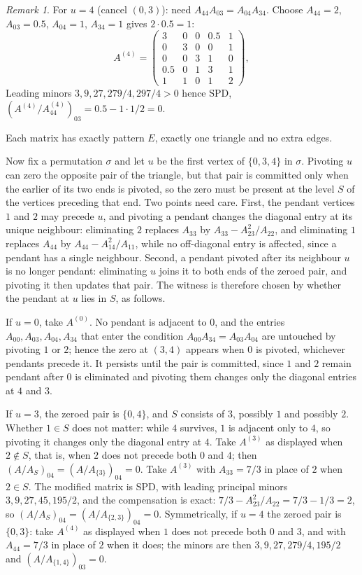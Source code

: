 \documentclass[11pt]{article}
\theoremstyle{plain}
\theoremstyle{definition}
\theoremstyle{remark}
\newtheorem{remark}[theorem]{Remark}
\begin{document}
\begin{humanaiblock}
\begin{remark}
For $u=4$ (cancel $(0,3)$): need $A_{44}A_{03}=A_{04}A_{34}$. Choose $A_{44}=2$, $A_{03}=0.5$, $A_{04}=1$, $A_{34}=1$ gives $2\cdot0.5=1$:
\[
A^{(4)}=\begin{pmatrix}
3&0&0&0.5&1\\
0&3&0&0&1\\
0&0&3&1&0\\
0.5&0&1&3&1\\
1&1&0&1&2
\end{pmatrix},
\]
Leading minors $3,9,27,279/4,297/4>0$ hence SPD, $(A^{(4)}/A^{(4)}_{44})_{03}=0.5-1\cdot1/2=0$.

Each matrix has exactly pattern $E$, exactly one triangle and no extra edges.

Now fix a permutation $\sigma$ and let $u$ be the first vertex of $\{0,3,4\}$ in $\sigma$. Pivoting
$u$ can zero the opposite pair of the triangle, but that pair is committed only when the earlier of
its two ends is pivoted, so the zero must be present at the level $S$ of the vertices preceding that
end. Two points need care. First, the pendant vertices $1$ and $2$ may precede $u$, and pivoting a
pendant changes the diagonal entry at its unique neighbour: eliminating $2$ replaces $A_{33}$ by
$A_{33}-A_{23}^2/A_{22}$, and eliminating $1$ replaces $A_{44}$ by $A_{44}-A_{14}^2/A_{11}$, while no
off-diagonal entry is affected, since a pendant has a single neighbour. Second, a pendant pivoted
after its neighbour $u$ is no longer pendant: eliminating $u$ joins it to both ends of the zeroed
pair, and pivoting it then updates that pair. The witness is therefore chosen by whether the pendant
at $u$ lies in $S$, as follows.

If $u=0$, take $A^{(0)}$. No pendant is adjacent to $0$, and the entries $A_{00},A_{03},A_{04},A_{34}$
that enter the condition $A_{00}A_{34}=A_{03}A_{04}$ are untouched by pivoting $1$ or $2$; hence the
zero at $(3,4)$ appears when $0$ is pivoted, whichever pendants precede it. It persists until the
pair is committed, since $1$ and $2$ remain pendant after $0$ is eliminated and pivoting them changes
only the diagonal entries at $4$ and $3$.

If $u=3$, the zeroed pair is $\{0,4\}$, and $S$ consists of $3$, possibly $1$ and possibly $2$.
Whether $1\in S$ does not matter: while $4$ survives, $1$ is adjacent only to $4$, so pivoting it
changes only the diagonal entry at $4$. Take $A^{(3)}$ as displayed when $2\notin S$, that is, when
$2$ does not precede both $0$ and $4$; then $(A/A_S)_{04}=(A/A_{\{3\}})_{04}=0$. Take $A^{(3)}$ with
$A_{33}=7/3$ in place of $2$ when $2\in S$. The modified matrix is SPD, with leading principal minors
$3,9,27,45,195/2$, and the compensation is exact: $7/3-A_{23}^2/A_{22}=7/3-1/3=2$, so
$(A/A_S)_{04}=(A/A_{\{2,3\}})_{04}=0$. Symmetrically, if $u=4$ the zeroed pair is $\{0,3\}$: take
$A^{(4)}$ as displayed when $1$ does not precede both $0$ and $3$, and with $A_{44}=7/3$ in place of
$2$ when it does; the minors are then $3,9,27,279/4,195/2$ and $(A/A_{\{1,4\}})_{03}=0$.


\end{remark}
\end{humanaiblock}
\end{document}
